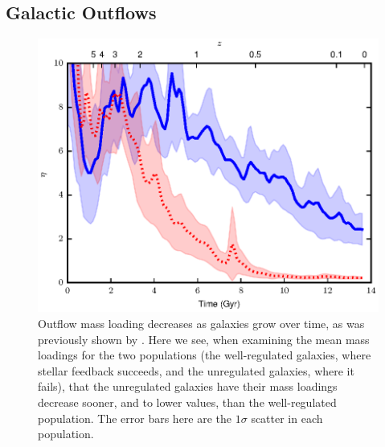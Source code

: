 \subsection{Galactic Outflows}
\begin{figure}
    \includegraphics[width=\columnwidth]{figures3/massloading_time.eps}
    \caption[Outflow mass loading evolution in MUGS2]{Outflow mass loading
    decreases as galaxies grow over time, as was previously shown by
    \citet{Keller2015}.  Here we see, when examining the mean mass loadings for
    the two populations (the well-regulated galaxies, where stellar feedback
    succeeds, and the unregulated galaxies, where it fails), that the
    unregulated galaxies have their mass loadings decrease sooner, and to lower
    values, than the well-regulated population.  The error bars here are the
    $1\sigma$ scatter in each population.}
    \label{massloading_time}
\end{figure}
